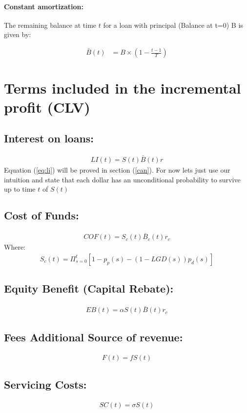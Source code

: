 \paragraph{Constant amortization: } The remaining balance at time $t$ for a loan with principal (Balance at t=0) B is given by:

\begin{align}
\bar{B}(t)&=B \times (1-\frac{t-1}{T})
\end{align}


\section{ Terms included in the incremental profit (CLV)}
\subsection{ Interest on loans: }
\begin{align}
LI(t) = S(t)\bar{ B}(t)r \label{eq:li}
\end{align}
Equation (\ref{eq:li}) will be proved in section (\ref{can}). For now lets just use our intuition and state that each dollar has an unconditional probability to survive up to time $t$ of $S(t)$ 
\subsection{  Cost of Funds: }
\begin{align}
COF(t) = S_c(t)\bar{ B}_c(t)r_c
\end{align}
Where: 
\begin{align}
S_c(t)= \Pi_{s=0}^t [1- p_p(s)-(1-LGD(s))p_d(s) ]
\end{align}

\subsection{ Equity Benefit (Capital Rebate): }
\begin{align}
EB(t) = \alpha S(t)\bar{ B}(t) r_c
\end{align}

\subsection{ Fees Additional Source of revenue: }
\begin{align}
F(t) = f S(t)
\end{align}

\subsection{ Servicing Costs: }
\begin{align}
SC(t) =  \sigma S(t)
\end{align}

